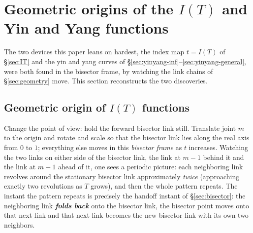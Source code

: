 \documentclass[11pt]{article}
\theoremstyle{definition}
\begin{document}
\section{Geometric origins of the \texorpdfstring{$I(T)$}{I(T)} and Yin and Yang functions}\label{sec:geometric-origins}

The two devices this paper leans on hardest, the index map $t=I(T)$ of
\S\ref{sec:IT} and the yin and yang curves of
\S\ref{sec:yinyang-inf}--\ref{sec:yinyang-general}, were both found in
the bisector frame, by watching the link chains of \S\ref{sec:geometry}
move. This section reconstructs the two discoveries.

\subsection{Geometric origin of \texorpdfstring{$I(T)$}{I(T)} functions}\label{sec:IT-origin}

Change the point of view: hold the forward bisector link still. Translate
joint $m$ to the origin and rotate and scale so that the bisector link lies
along the real axis from $0$ to $1$; everything else moves in this \emph{bisector
frame} as $t$ increases. Watching the two links on either side of the bisector
link, the link at $m-1$ behind it and the link at $m+1$ ahead of it, one
sees a periodic picture: each neighboring link revolves around the
stationary bisector link approximately \emph{twice} (approaching exactly two
revolutions as $T$ grows), and then the whole pattern repeats. The instant the
pattern repeats is precisely the handoff instant of \S\ref{sec:bisector}: the
neighboring link \textbf{\emph{folds back}} onto the bisector link, the bisector point moves
onto that next link and that next link becomes the new bisector link with its own two
neighbors.
\end{document}
